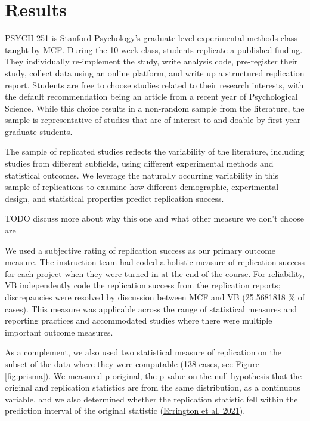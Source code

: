 \documentclass[
  english,
  a4paper,
]{article}
\begin{document}
\hypertarget{results}{%
\section{Results}\label{results}}

PSYCH 251 is Stanford Psychology's graduate-level experimental methods class taught by MCF. During the 10 week class, students replicate a published finding. They individually re-implement the study, write analysis code, pre-register their study, collect data using an online platform, and write up a structured replication report. Students are free to choose studies related to their research interests, with the default recommendation being an article from a recent year of Psychological Science. While this choice results in a non-random sample from the literature, the sample is representative of studies that are of interest to and doable by first year graduate students.

The sample of replicated studies reflects the variability of the literature, including studies from different subfields, using different experimental methods and statistical outcomes. We leverage the naturally occurring variability in this sample of replications to examine how different demographic, experimental design, and statistical properties predict replication success.

TODO discuss more about why this one and what other measure we don't choose are

We used a subjective rating of replication success as our primary outcome measure. The instruction team had coded a holistic measure of replication success for each project when they were turned in at the end of the course. For reliability, VB independently code the replication success from the replication reports; discrepancies were resolved by discussion between MCF and VB (25.5681818 \% of cases). This measure was applicable across the range of statistical measures and reporting practices and accommodated studies where there were multiple important outcome measures.

As a complement, we also used two statistical measure of replication on the subset of the data where they were computable (138 cases, see Figure \ref{fig:prisma}). We measured p-original, the p-value on the null hypothesis that the original and replication statistics are from the same distribution, as a continuous variable, and we also determined whether the replication statistic fell within the prediction interval of the original statistic (\protect\hyperlink{ref-errington2021}{Errington et al. 2021}).
\end{document}
